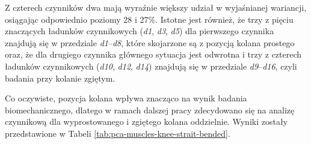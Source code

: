 Z czterech czynników dwa mają wyraźnie większy udział w wyjaśnianej wariancji, osiągając odpowiednio poziomy 28 i 27\%. Istotne jest również, że trzy z pięciu znaczących ładunków czynnikowych (\textit{d1}, \textit{d3}, \textit{d5}) dla pierwszego czynnika znajdują się w przedziale \textit{d1}--\textit{d8}, które skojarzone są z pozycją kolana prostego oraz, \linebreak że dla drugiego czynnika głównego sytuacja jest odwrotna i trzy z czterech ładunków czynnikowych (\textit{d10}, \textit{d12}, \textit{d14}) znajdują się w przedziale \textit{d9}--\textit{d16}, czyli badania przy kolanie zgiętym. 

Co oczywiste, pozycja kolana wpływa znacząco na wynik badania biomechanicznego, dlatego w ramach dalszej pracy zdecydowano się na  analizę czynnikową dla wyprostowanego i zgiętego kolana oddzielnie. Wyniki zostały przedstawione \linebreak w Tabeli \ref{tab:pca-muscles-knee-strait-bended}. 

